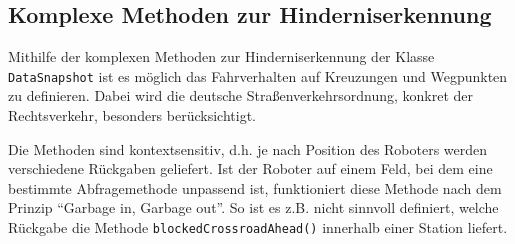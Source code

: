 
\subsection*{Komplexe Methoden zur Hinderniserkennung}

Mithilfe der komplexen Methoden zur Hinderniserkennung der Klasse \texttt{DataSnapshot} ist es möglich das Fahrverhalten auf Kreuzungen und Wegpunkten zu definieren. 
Dabei wird die deutsche Straßenverkehrsordnung, konkret der Rechtsverkehr, besonders berücksichtigt.

Die Methoden sind kontextsensitiv, d.h. je nach Position des Roboters werden verschiedene Rückgaben geliefert.
Ist der Roboter auf einem Feld, bei dem eine bestimmte Abfragemethode unpassend ist, funktioniert diese Methode nach dem Prinzip \enquote{Garbage in, Garbage out}. 
So ist es z.B. nicht sinnvoll definiert, welche Rückgabe die Methode \texttt{blockedCrossroadAhead()} innerhalb einer Station liefert.


